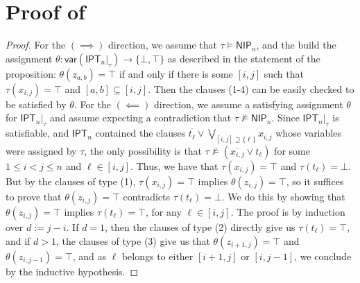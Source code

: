 \documentclass[11pt]{article}
\begin{document}



\appendix

\section{Proof of~\texorpdfstring{}{Proposition 19}}\label{sec:appendix}

\iptcorrectness*
\begin{proof}
    For the $(\implies)$ direction, we assume that $\tau \models \textsf{NIP}_n$, and the build the assignment $\theta : \textsf{var}(\textsf{IPT}_n|_\tau) \to \{\bot, \top\}$ as described in the statement of the proposition:
    \( \theta(z_{a, b}) = \top \) if and only if there is some $[i, j]$ such that $\tau(x_{i, j}) = \top$ and $[a, b] \subseteq [i, j]$.
    Then the clauses (1-4) can be easily checked to be satisfied by $\theta$.  
        For the $(\impliedby)$ direction, we assume a satisfying assignment $\theta$ for $\textsf{IPT}_n|_\tau$ and assume expecting a contradiction that $\tau \nvDash \textsf{NIP}_n$. Since $\textsf{IPT}_n|_\tau$ is satisfiable, and $\textsf{IPT}_n$ contained the clauses $\overline{t_\ell} \lor \bigvee_{[i, j] \supseteq \{\ell\}} x_{i, j}$ whose variables were assigned by $\tau$, the only possibility is that 
    \(
    \tau \nvDash (\overline{x_{i, j}} \lor t_\ell)
    \) for some $1 \leq i < j \leq n$ and $\ell \in [i, j]$.  %
    Thus, we have that $\tau(x_{i, j}) = \top$ and $\tau(t_\ell) = \bot$.  %
    But by the clauses of type (1), $\tau(x_{i, j}) = \top$ implies $\theta(z_{i, j}) = \top$, so it suffices to prove that $\theta(z_{i, j}) = \top$ contradicts $\tau(t_\ell) = \bot$. We do this by showing that $\theta(z_{i, j}) = \top$ implies $\tau(t_\ell) = \top$, for any $\ell \in [i, j]$. The proof is by induction over $d := j-i$. If $d = 1$,
    then the clauses of type (2) directly give us $\tau(t_\ell) = \top$, and if $d > 1$, the clauses of type (3) give us that $\theta(z_{i+1, j}) = \top$ and $\theta(z_{i, j-1}) = \top$, and as $\ell$ belongs to either $[i+1, j]$ or $[i, j-1]$, we conclude by the inductive hypothesis. 
    


\end{proof}
\end{document}
